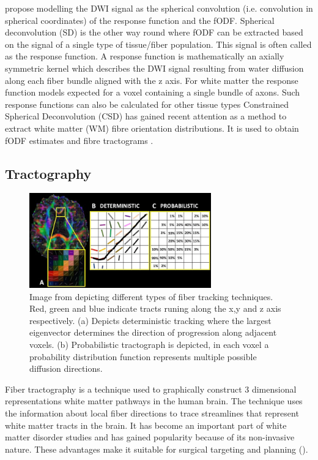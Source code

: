 \documentclass[msthesis.tex]{subfiles}
\begin{document}
 \cite{tournier2004direct} propose modelling the DWI signal as the spherical convolution (i.e. convolution in spherical coordinates) of the response function and the fODF. Spherical deconvolution (SD) is the other way round where fODF can be extracted based on the signal of a single type of tissue/fiber population. This signal is often called as the response function. A response function is mathematically an axially symmetric kernel which describes the DWI signal resulting from water diffusion along each fiber bundle aligned with the z axis. For white matter the response function models expected for a voxel containing a single bundle of axons. Such response functions can also be calculated for other tissue types
Constrained Spherical Deconvolution (CSD) has gained recent attention as a method to extract white matter (WM) fibre orientation distributions. It is used to obtain fODF estimates and fibre tractograms \cite{JEURISSEN2014411}.

\subsection{Tractography}
\label{subsub:tractography}
\begin{figure}
    \centering
    \includegraphics[width=0.7\textwidth]{images/A-Degree-of-anisotropy-B-Deterministic-fiber-tracking-the-fiber-path-across-voxels-is.png}
    \caption{Image from \cite{muller2018clinically} depicting different types of fiber tracking techniques. Red, green and blue indicate tracts runing along the x,y and z axis respectively. (a) Depicts deterministic tracking where the largest eigenvector determines the direction of progression along adjacent voxels. (b) Probabilistic tractograph is depicted, in each voxel a probability distribution function represents multiple possible diffusion directions.}
    \label{fig:tracking}
\end{figure}
Fiber tractography is a technique used to graphically construct  3 dimensional representations white matter pathways in the human brain. The technique uses the information about local fiber directions to trace streamlines that represent white matter tracts in the brain. It has become an important part of white matter disorder studies and has gained popularity because of its non-invasive nature. These advantages make it suitable for surgical targeting and planning (\cite{romano2009pre}).
\end{document}
